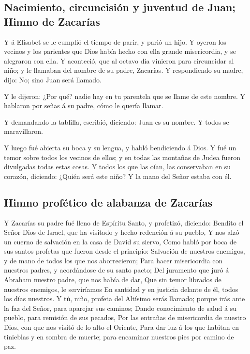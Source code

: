 \hypertarget{nacimiento-circuncisiuxf3n-y-juventud-de-juan-himno-de-zacaruxedas}{%
\subsection{Nacimiento, circuncisión y juventud de Juan; Himno de
Zacarías}\label{nacimiento-circuncisiuxf3n-y-juventud-de-juan-himno-de-zacaruxedas}}

 Y á Elisabet se le cumplió el tiempo de parir, y parió
un hijo.  Y oyeron los vecinos y los parientes que Dios
había hecho con ella grande misericordia, y se alegraron con ella.
 Y aconteció, que al octavo día vinieron para circuncidar
al niño; y le llamaban del nombre de su padre, Zacarías. 
Y respondiendo su madre, dijo: No; sino Juan será llamado.

 Y le dijeron: ¿Por qué? nadie hay en tu parentela que se
llame de este nombre.  Y hablaron por señas á su padre,
cómo le quería llamar.

 Y demandando la tablilla, escribió, diciendo: Juan es su
nombre. Y todos se maravillaron.

 Y luego fué abierta su boca y su lengua, y habló
bendiciendo á Dios.  Y fué un temor sobre todos los
vecinos de ellos; y en todas las montañas de Judea fueron divulgadas
todas estas cosas.  Y todos los que las oían, las
conservaban en su corazón, diciendo: ¿Quién será este niño? Y la mano
del Señor estaba con él.

\hypertarget{himno-profuxe9tico-de-alabanza-de-zacaruxedas}{%
\subsection{Himno profético de alabanza de
Zacarías}\label{himno-profuxe9tico-de-alabanza-de-zacaruxedas}}

 Y Zacarías su padre fué lleno de Espíritu Santo, y
profetizó, diciendo:  Bendito el Señor Dios de Israel,
que ha visitado y hecho redención á su pueblo,  Y nos
alzó un cuerno de salvación en la casa de David su siervo,
 Como habló por boca de sus santos profetas que fueron
desde el principio:  Salvación de nuestros enemigos, y de
mano de todos los que nos aborrecieron;  Para hacer
misericordia con nuestros padres, y acordándose de su santo pacto;
 Del juramento que juró á Abraham nuestro padre, que nos
había de dar,  Que sin temor librados de nuestros
enemigos, le serviríamos  En santidad y en justicia
delante de él, todos los días nuestros.  Y tú, niño,
profeta del Altísimo serás llamado; porque irás ante la faz del Señor,
para aparejar sus caminos;  Dando conocimiento de salud á
su pueblo, para remisión de sus pecados,  Por las
entrañas de misericordia de nuestro Dios, con que nos visitó de lo alto
el Oriente,  Para dar luz á los que habitan en tinieblas
y en sombra de muerte; para encaminar nuestros pies por camino de paz.

